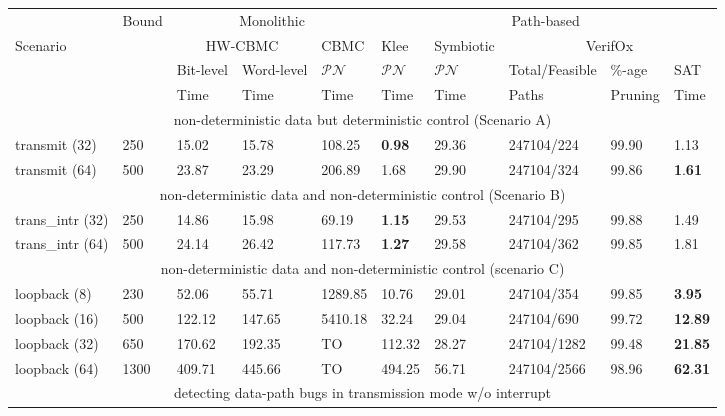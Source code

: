 \documentclass[sigconf]{acmart}
\begin{document}
\begin{table}
\begin{center}
{
\begin{scriptsize}
\begin{tabular}{|l|l|l|l|l|l|l|l|l|l|}
\hline
  & Bound & \multicolumn{3}{c|}{Monolithic} & \multicolumn{5}{c|}{Path-based} \\ 
\cline{3-10}
 Scenario &  & \multicolumn{2}{c|}{HW-CBMC} & CBMC & Klee & Symbiotic & \multicolumn{3}{c|}{VerifOx} \\ 
\cline{3-10}
      &       &  Bit-level & Word-level & $\mathcal{PN}$ & $\mathcal{PN}$ & $\mathcal{PN}$ & Total/Feasible & \%-age & SAT \\
\cline{1-7}
      &       &   Time     &   Time      & Time  &  Time & Time & Paths & Pruning & Time \\
\cline{1-10}      
\multicolumn{10}{|c|}{non-deterministic data but deterministic control (Scenario A)} \\ \hline
transmit (32) & 250 & 15.02 & 15.78 & 108.25 & \textbf{0}.\textbf{98} & 29.36 & 247104/224 & 99.90 & 1.13 \\ 
transmit (64) & 500 & 23.87 & 23.29 & 206.89 & 1.68 & 29.90 & 247104/324 & 99.86 & \textbf{1}.\textbf{61}  \\ \hline 
\multicolumn{10}{|c|}{non-deterministic data and non-deterministic control
(Scenario B)} \\ \hline
trans\_intr (32) & 250 & 14.86 & 15.98 & 69.19 & \textbf{1}.\textbf{15} & 29.53 & 247104/295 & 99.88 & 1.49 \\
trans\_intr (64) & 500 & 24.14 & 26.42 & 117.73 & \textbf{1}.\textbf{27} & 29.58 & 247104/362 & 99.85 & 1.81 \\ \hline
\multicolumn{10}{|c|}{non-deterministic data and non-deterministic control
(scenario C)} \\ \hline
loopback (8)  & 230 & 52.06 & 55.71 & 1289.85 & 10.76 & 29.01 & 247104/354 & 99.85 & \textbf{3}.\textbf{95} \\ 
loopback (16) & 500 & 122.12 & 147.65 & 5410.18 & 32.24 & 29.04 & 247104/690 & 99.72 & \textbf{12}.\textbf{89} \\ 
loopback (32) & 650 & 170.62 & 192.35 & TO & 112.32 & 28.27 & 247104/1282 & 99.48 & \textbf{21}.\textbf{85}   \\ 
loopback (64) & 1300 & 409.71 & 445.66 & TO & 494.25 & 56.71 & 247104/2566 & 98.96 & \textbf{62}.\textbf{31}  \\ \hline
\multicolumn{10}{|c|}{detecting data-path bugs in transmission mode w/o interrupt} \\ \hline

\end{tabular}
\end{scriptsize}}
\end{center}
\end{table}
\end{document}
